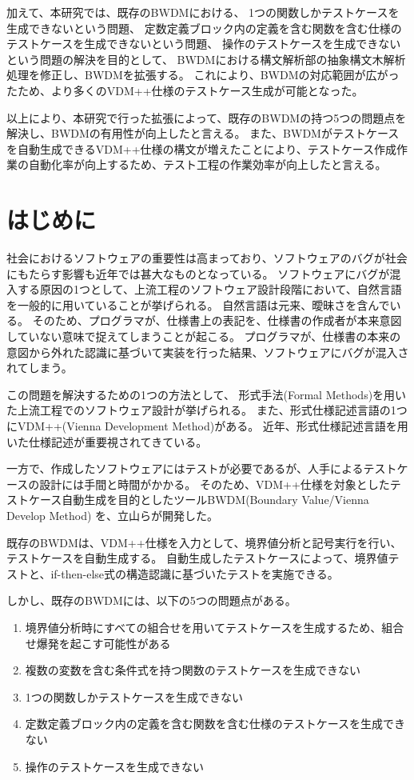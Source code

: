 \documentclass[uplatex, report, a4j, 10pt]{jsbook}
\begin{document}
加えて、本研究では、既存のBWDMにおける、
1つの関数しかテストケースを生成できないという問題、
定数定義ブロック内の定義を含む関数を含む仕様のテストケースを生成できないという問題、
操作のテストケースを生成できないという問題の解決を目的として、
BWDMにおける構文解析部の抽象構文木解析処理を修正し、BWDMを拡張する。
これにより、BWDMの対応範囲が広がったため、より多くのVDM++仕様のテストケース生成が可能となった。

以上により、本研究で行った拡張によって、既存のBWDMの持つ5つの問題点を解決し、BWDMの有用性が向上したと言える。
また、BWDMがテストケースを自動生成できるVDM++仕様の構文が増えたことにより、テストケース作成作業の自動化率が向上するため、テスト工程の作業効率が向上したと言える。

%
\chapter{はじめに}\label{cha:Introduction}
社会におけるソフトウェアの重要性は高まっており、ソフトウェアのバグが社会にもたらす影響も近年では甚大なものとなっている\cite{mizuho}。
ソフトウェアにバグが混入する原因の1つとして、上流工程のソフトウェア設計段階において、自然言語を一般的に用いていることが挙げられる\cite{seminarFormalMethod}。
自然言語は元来、曖昧さを含んでいる。
そのため、プログラマが、仕様書上の表記を、仕様書の作成者が本来意図していない意味で捉えてしまうことが起こる。
プログラマが、仕様書の本来の意図から外れた認識に基づいて実装を行った結果、ソフトウェアにバグが混入されてしまう。

この問題を解決するための1つの方法として、
形式手法(Formal Methods)\cite{programSpecification}を用いた上流工程でのソフトウェア設計が挙げられる。
また、形式仕様記述言語の1つにVDM++(Vienna Development Method)がある\cite{vdm_manual}。
近年、形式仕様記述言語を用いた仕様記述が重要視されてきている\cite{seminarFormalMethod}。

一方で、作成したソフトウェアにはテストが必要であるが、人手によるテストケースの設計には手間と時間がかかる。
そのため、VDM++仕様を対象としたテストケース自動生成を目的としたツールBWDM(Boundary Value/Vienna Develop Method)
を、立山らが開発した\cite{tachiyama8, tachiyama6}。

既存のBWDMは、VDM++仕様を入力として、境界値分析と記号実行を行い、テストケースを自動生成する。
自動生成したテストケースによって、境界値テストと、if-then-else式の構造認識に基づいたテストを実施できる。

しかし、既存のBWDMには、以下の5つの問題点がある。

\begin{enumerate}[label=(\alph*)]
  \item\label{problem:1} 境界値分析時にすべての組合せを用いてテストケースを生成するため、組合せ爆発を起こす可能性がある
  \item\label{problem:2} 複数の変数を含む条件式を持つ関数のテストケースを生成できない
  \item\label{problem:3} 1つの関数しかテストケースを生成できない
  \item\label{problem:4} 定数定義ブロック内の定義を含む関数を含む仕様のテストケースを生成できない
  \item\label{problem:5} 操作のテストケースを生成できない
\end{enumerate}
\end{document}
